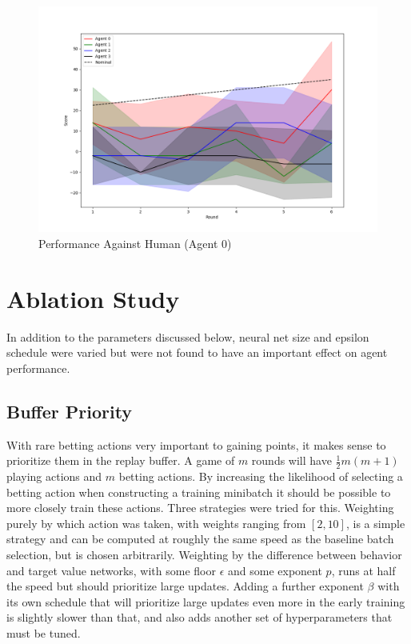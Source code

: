 \documentclass[10pt]{article} %
\begin{document}

\begin{figure}[h!]
\centering
\includegraphics[width=0.55\linewidth]{human_game.png}
\caption{Performance Against Human (Agent 0)} \label{fig:human}
\end{figure}

\newpage

\section{Ablation Study}

In addition to the parameters discussed below, neural net size and epsilon schedule were varied but were not found to have an important effect on agent performance.

\subsection{Buffer Priority}

With rare betting actions very important to gaining points, it makes sense to prioritize them in the replay buffer. A game of $m$ rounds will have $\frac{1}{2}m(m+1)$ playing actions and $m$ betting actions. By increasing the likelihood of selecting a betting action when constructing a training minibatch it should be possible to more closely train these actions. Three strategies were tried for this. Weighting purely by which action was taken, with weights ranging from $[2,10]$, is a simple strategy and can be computed at roughly the same speed as the baseline batch selection, but is chosen arbitrarily. Weighting by the difference between behavior and target value networks, with some floor $\epsilon$ and some exponent $p$, runs at half the speed but should prioritize large updates. Adding a further exponent $\beta$ with its own schedule that will prioritize large updates even more in the early training is slightly slower than that, and also adds another set of hyperparameters that must be tuned.
\end{document}
